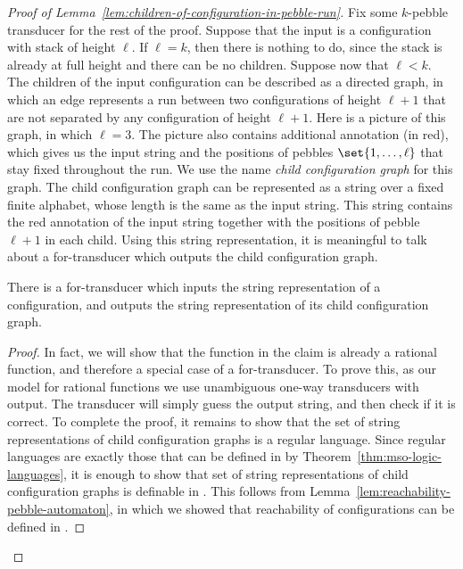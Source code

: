 \begin{proof}[Proof of Lemma~\ref{lem:children-of-configuration-in-pebble-run}] Fix some $k$-pebble transducer for the rest of the proof.   Suppose that the input is a configuration with stack of height $\ell$. If $\ell =k$, then there is nothing to do, since the stack is already at full height and there can be no children. Suppose now that $\ell < k$. The children of the input configuration can be  described as a directed graph, in which an edge represents a run between two configurations of height $\ell+1$ that are not separated by any configuration of height $\ell +1$. Here is a picture of this graph, in which $\ell=3$.
The picture also contains additional annotation (in red), which gives us the input string and the positions of pebbles $\set{1,\ldots,\ell}$ that stay fixed throughout the run. We use the name \emph{child configuration graph} for this graph. The child configuration graph can be represented as a string over a fixed finite alphabet, whose length is the same as the input string.  This string contains the red annotation of the input string together with the positions of pebble $\ell+1$ in each child. Using this string representation, it is meaningful to talk about a for-transducer which outputs the child configuration graph.

\begin{claim}\label{claim:from-configuration-to-child-configuration-graph}
    There is a for-transducer which inputs the string representation of a configuration, and outputs the  string representation of its child configuration graph. 
\end{claim}
\begin{proof}  In fact, we will show that the function in the claim is already a rational function, and therefore a special case of a for-transducer. To prove this, as our model for rational functions we use unambiguous one-way transducers with output. The transducer will simply guess the output string, and then check if it is correct. To complete the proof, it remains to show that the set of string representations of child configuration graphs is a regular language.
Since regular languages are exactly those that can be defined in \mso by Theorem~\ref{thm:mso-logic-languages}, it is enough to show that set of string representations of child configuration graphs is definable in \mso. This follows from  Lemma~\ref{lem:reachability-pebble-automaton}, in which we showed that  reachability of configurations can be defined in \mso. 
\end{proof}


\end{proof}
